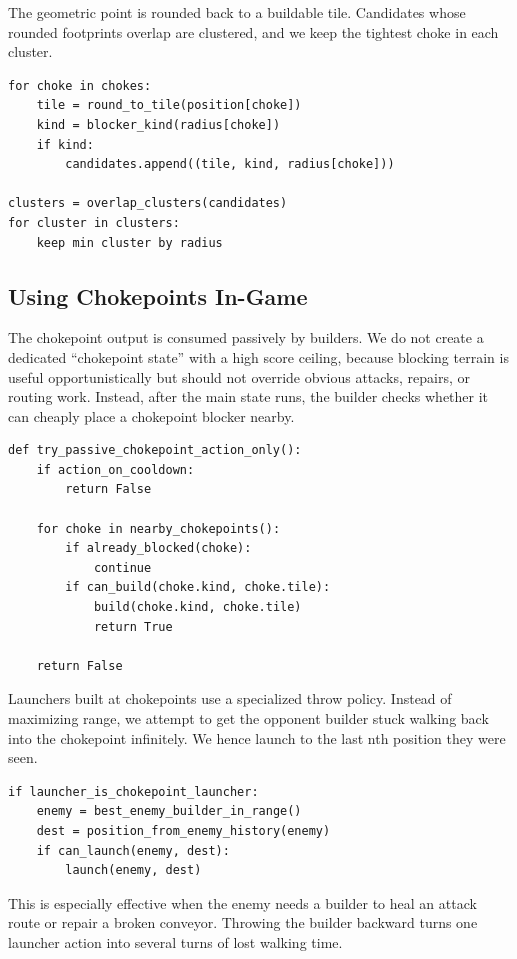 \documentclass[10pt,sigconf,nonacm]{acmart}
\begin{document}
The geometric point is rounded back to a buildable tile. Candidates whose
rounded footprints overlap are clustered, and we keep the tightest choke
in each cluster.

\begin{lstlisting}
for choke in chokes:
    tile = round_to_tile(position[choke])
    kind = blocker_kind(radius[choke])
    if kind:
        candidates.append((tile, kind, radius[choke]))

clusters = overlap_clusters(candidates)
for cluster in clusters:
    keep min cluster by radius
\end{lstlisting}

\subsection{Using Chokepoints In-Game}

The chokepoint output is consumed passively by builders. We do not create
a dedicated ``chokepoint state'' with a high score ceiling, because
blocking terrain is useful opportunistically but should not override
obvious attacks, repairs, or routing work. Instead, after the main state
runs, the builder checks whether it can cheaply place a chokepoint blocker
nearby.

\begin{lstlisting}
def try_passive_chokepoint_action_only():
    if action_on_cooldown:
        return False

    for choke in nearby_chokepoints():
        if already_blocked(choke):
            continue
        if can_build(choke.kind, choke.tile):
            build(choke.kind, choke.tile)
            return True

    return False
\end{lstlisting}

Launchers built at chokepoints use a specialized throw policy. Instead of
maximizing range, we attempt to get the opponent builder stuck walking back into the chokepoint infinitely. We hence launch to the last nth position they were seen.

\begin{lstlisting}
if launcher_is_chokepoint_launcher:
    enemy = best_enemy_builder_in_range()
    dest = position_from_enemy_history(enemy)
    if can_launch(enemy, dest):
        launch(enemy, dest)
\end{lstlisting}

This is especially effective when the enemy needs a builder to heal an
attack route or repair a broken conveyor. Throwing the builder backward
turns one launcher action into several turns of lost walking time.
\end{document}
